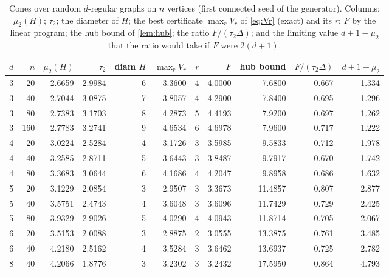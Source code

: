 \documentclass[11pt]{amsart}
\theoremstyle{definition}
\begin{document}
\begin{table}[ht]
\centering
\small
\setlength{\tabcolsep}{4.5pt}
\caption{Cones over random $d$-regular graphs on $n$ vertices (first connected seed of the generator). Columns: $\mu_2(H)$; $\tau_2$; the diameter of $H$; the best certificate $\max_rV_r$ of \eqref{eq:Vr} (exact) and its $r$; $F$ by the linear program; the hub bound of \cref{lem:hub}; the ratio $F/(\tau_2\Delta)$; and the limiting value $d+1-\mu_2$ that the ratio would take if $F$ were $2(d+1)$.}\label{tab:rr}
\begin{tabular}{rrrrrrrrrrr}
\toprule
$d$ & $n$ & $\mu_2(H)$ & $\tau_2$ & diam $H$ & $\max_rV_r$ & $r$ & $F$ & hub bound & $F/(\tau_2\Delta)$ & $d+1-\mu_2$\\
\midrule
3 & 20 & 2.6659 & 2.9984 & 6 & 3.3600 & 4 & 4.0000 & 7.6800 & 0.667 & 1.334\\
3 & 40 & 2.7044 & 3.0875 & 7 & 3.8057 & 4 & 4.2900 & 7.8400 & 0.695 & 1.296\\
3 & 80 & 2.7383 & 3.1703 & 8 & 4.2873 & 5 & 4.4193 & 7.9200 & 0.697 & 1.262\\
3 & 160 & 2.7783 & 3.2741 & 9 & 4.6534 & 6 & 4.6978 & 7.9600 & 0.717 & 1.222\\
4 & 20 & 3.0224 & 2.5284 & 4 & 3.1726 & 3 & 3.5985 & 9.5833 & 0.712 & 1.978\\
4 & 40 & 3.2585 & 2.8711 & 5 & 3.6443 & 3 & 3.8487 & 9.7917 & 0.670 & 1.742\\
4 & 80 & 3.3683 & 3.0644 & 6 & 4.1686 & 4 & 4.2047 & 9.8958 & 0.686 & 1.632\\
5 & 20 & 3.1229 & 2.0854 & 3 & 2.9507 & 3 & 3.3673 & 11.4857 & 0.807 & 2.877\\
5 & 40 & 3.5751 & 2.4743 & 4 & 3.6048 & 3 & 3.6096 & 11.7429 & 0.729 & 2.425\\
5 & 80 & 3.9329 & 2.9026 & 5 & 4.0290 & 4 & 4.0943 & 11.8714 & 0.705 & 2.067\\
6 & 20 & 3.5153 & 2.0088 & 3 & 2.8875 & 2 & 3.0555 & 13.3875 & 0.761 & 3.485\\
6 & 40 & 4.2180 & 2.5162 & 4 & 3.5284 & 3 & 3.6462 & 13.6937 & 0.725 & 2.782\\
8 & 40 & 4.2066 & 1.8776 & 3 & 3.2302 & 3 & 3.2432 & 17.5950 & 0.864 & 4.793\\
\bottomrule
\end{tabular}
\end{table}
\end{document}
